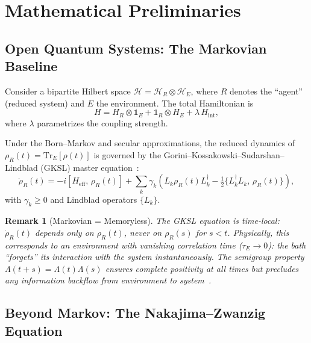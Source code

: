 \documentclass[12pt]{article}
\newtheorem{remark}[theorem]{Remark}
\begin{document}
\section{Mathematical Preliminaries}
\label{sec:prelim}

\subsection{Open Quantum Systems: The Markovian Baseline}

Consider a bipartite Hilbert space
$\mathcal{H} = \mathcal{H}_R \otimes \mathcal{H}_E$,
where $R$ denotes the ``agent'' (reduced system) and $E$ the
environment. The total Hamiltonian is
\begin{equation}
\label{eq:H_total}
H = H_R \otimes \mathbb{1}_E
  + \mathbb{1}_R \otimes H_E
  + \lambda\, H_{\mathrm{int}},
\end{equation}
where $\lambda$ parametrizes the coupling strength.

Under the Born--Markov and secular approximations, the reduced
dynamics of $\rho_R(t) = \mathrm{Tr}_E[\rho(t)]$ is governed by
the Gorini--Kossakowski--Sudarshan--Lindblad (GKSL) master
equation~\cite{Lindblad1976,GKS1976}:
\begin{equation}
\label{eq:GKSL}
\dot{\rho}_R(t)
= -i[H_{\mathrm{eff}},\, \rho_R(t)]
  + \sum_k \gamma_k \left(
    L_k \rho_R(t) L_k^\dagger
    - \tfrac{1}{2}\{L_k^\dagger L_k,\, \rho_R(t)\}
  \right),
\end{equation}
with $\gamma_k \geq 0$ and Lindblad operators $\{L_k\}$.

\begin{remark}[Markovian = Memoryless]
\label{rem:markov}
The GKSL equation is \emph{time-local}: $\dot{\rho}_R(t)$ depends
only on $\rho_R(t)$, never on $\rho_R(s)$ for $s < t$.
Physically, this corresponds to an environment with vanishing
correlation time ($\tau_E \to 0$): the bath ``forgets'' its
interaction with the system instantaneously.
The semigroup property $\Lambda(t+s) = \Lambda(t)\Lambda(s)$
ensures complete positivity at all times but precludes any
information backflow from environment to system~\cite{RivasHuelgaPlenio2014}.
\end{remark}

\subsection{Beyond Markov: The Nakajima--Zwanzig Equation}
\end{document}
